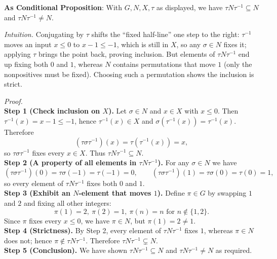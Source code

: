 \documentclass[12pt]{article}
\theoremstyle{definition}
\begin{document}
\noindent \textbf{As Conditional Proposition}: With $G,N,X,\tau$ as displayed, we have $\tau N\tau^{-1}\subseteq N$ and $\tau N\tau^{-1}\neq N$.

\newpage

\dotfill

\emph{Intuition.} Conjugating by $\tau$ shifts the “fixed half-line” one step to the right: $\tau^{-1}$ moves an input $x\le 0$ to $x-1\le -1$, which is still in $X$, so any $\sigma\in N$ fixes it; applying $\tau$ brings the point back, proving inclusion. But elements of $\tau N\tau^{-1}$ end up fixing both $0$ and $1$, whereas $N$ contains permutations that move $1$ (only the nonpositives must be fixed). Choosing such a permutation shows the inclusion is strict.\\

\dotfill

\emph{Proof.}\\
\textbf{Step 1 (Check inclusion on $X$).} Let $\sigma\in N$ and $x\in X$ with $x\le 0$. Then $\tau^{-1}(x)=x-1\le -1$, hence $\tau^{-1}(x)\in X$ and $\sigma(\tau^{-1}(x))=\tau^{-1}(x)$. Therefore 
\[
(\tau\sigma\tau^{-1})(x)=\tau(\tau^{-1}(x))=x,
\]
so $\tau\sigma\tau^{-1}$ fixes every $x\in X$. Thus $\tau N\tau^{-1}\subseteq N$.\\
\textbf{Step 2 (A property of all elements in $\tau N\tau^{-1}$).} For any $\sigma\in N$ we have 
\[
(\tau\sigma\tau^{-1})(0)=\tau\sigma(-1)=\tau(-1)=0,\qquad
(\tau\sigma\tau^{-1})(1)=\tau\sigma(0)=\tau(0)=1,
\]
so every element of $\tau N\tau^{-1}$ fixes both $0$ and $1$.\\
\textbf{Step 3 (Exhibit an $N$-element that moves $1$).} Define $\pi\in G$ by swapping $1$ and $2$ and fixing all other integers:
\[
\pi(1)=2,\ \pi(2)=1,\ \pi(n)=n \text{ for } n\notin\{1,2\}.
\]
Since $\pi$ fixes every $x\le 0$, we have $\pi\in N$, but $\pi(1)=2\ne 1$.\\
\textbf{Step 4 (Strictness).} By Step 2, every element of $\tau N\tau^{-1}$ fixes $1$, whereas $\pi\in N$ does not; hence $\pi\notin \tau N\tau^{-1}$. Therefore $\tau N\tau^{-1}\subsetneq N$.\\
\textbf{Step 5 (Conclusion).} We have shown $\tau N\tau^{-1}\subseteq N$ and $\tau N\tau^{-1}\ne N$ as required.\\

\newpage
\end{document}
